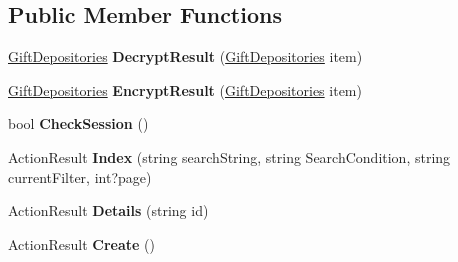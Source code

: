 \subsection*{Public Member Functions}
\begin{DoxyCompactItemize}
\item 
\hyperlink{class_cloud_bread_admin_web_1_1_gift_depositories}{Gift\+Depositories} {\bfseries Decrypt\+Result} (\hyperlink{class_cloud_bread_admin_web_1_1_gift_depositories}{Gift\+Depositories} item)\hypertarget{class_cloud_bread_admin_web_1_1_controllers_1_1_gift_depositories_controller_a19a4ed752e8df39fef5d7021427d9dbf}{}\label{class_cloud_bread_admin_web_1_1_controllers_1_1_gift_depositories_controller_a19a4ed752e8df39fef5d7021427d9dbf}

\item 
\hyperlink{class_cloud_bread_admin_web_1_1_gift_depositories}{Gift\+Depositories} {\bfseries Encrypt\+Result} (\hyperlink{class_cloud_bread_admin_web_1_1_gift_depositories}{Gift\+Depositories} item)\hypertarget{class_cloud_bread_admin_web_1_1_controllers_1_1_gift_depositories_controller_ad13e8ee4dfa8debf7385d288f1a9c189}{}\label{class_cloud_bread_admin_web_1_1_controllers_1_1_gift_depositories_controller_ad13e8ee4dfa8debf7385d288f1a9c189}

\item 
bool {\bfseries Check\+Session} ()\hypertarget{class_cloud_bread_admin_web_1_1_controllers_1_1_gift_depositories_controller_ac83d65a549bd88ca67100b6c279f25c9}{}\label{class_cloud_bread_admin_web_1_1_controllers_1_1_gift_depositories_controller_ac83d65a549bd88ca67100b6c279f25c9}

\item 
Action\+Result {\bfseries Index} (string search\+String, string Search\+Condition, string current\+Filter, int?page)\hypertarget{class_cloud_bread_admin_web_1_1_controllers_1_1_gift_depositories_controller_a7b24a6befd1e8d18f61e0db027631729}{}\label{class_cloud_bread_admin_web_1_1_controllers_1_1_gift_depositories_controller_a7b24a6befd1e8d18f61e0db027631729}

\item 
Action\+Result {\bfseries Details} (string id)\hypertarget{class_cloud_bread_admin_web_1_1_controllers_1_1_gift_depositories_controller_aa4bbcf592c6168a7ec2f34ad956042bf}{}\label{class_cloud_bread_admin_web_1_1_controllers_1_1_gift_depositories_controller_aa4bbcf592c6168a7ec2f34ad956042bf}

\item 
Action\+Result {\bfseries Create} ()\hypertarget{class_cloud_bread_admin_web_1_1_controllers_1_1_gift_depositories_controller_afc99e05312f28141718d0f4660221e4c}{}\label{class_cloud_bread_admin_web_1_1_controllers_1_1_gift_depositories_controller_afc99e05312f28141718d0f4660221e4c}


\end{DoxyCompactItemize}
